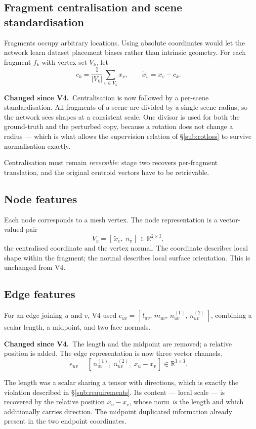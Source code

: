 \documentclass[11pt,a4paper]{report}
\newcommand{\change}[1]{\par\vspace{2pt}\noindent\textcolor{soft}{\small\textbf{Changed since V4.}\ #1}\par\vspace{2pt}}
\begin{document}
\subsection{Fragment centralisation and scene standardisation}
\label{sub:centralisation}

Fragments occupy arbitrary locations. Using absolute coordinates would let the
network learn dataset placement biases rather than intrinsic geometry. For each
fragment $f_k$ with vertex set $V_k$, let
\[
c_k = \frac{1}{|V_k|}\sum_{v \in V_k} x_v, \qquad \tilde{x}_v = x_v - c_k .
\]

\change{Centralisation is now followed by a per-scene standardisation. All
fragments of a scene are divided by a single scene radius, so the network sees
shapes at a consistent scale. One divisor is used for both the ground-truth and
the perturbed copy, because a rotation does not change a radius --- which is
what allows the supervision relation of \S\ref{sub:rotloss} to survive
normalisation exactly.}

Centralisation must remain \emph{reversible}: stage two recovers per-fragment
translation, and the original centroid vectors have to be retrievable.

\subsection{Node features}
\label{sub:node}

Each node corresponds to a mesh vertex. The node representation is a
vector-valued pair
\[
V_v = [\,\tilde{x}_v,\; n_v\,] \in \mathbb{R}^{2\times 3},
\]
the centralised coordinate and the vertex normal. The coordinate describes local
shape within the fragment; the normal describes local surface orientation. This
is unchanged from V4.

\subsection{Edge features}
\label{sub:edge}

For an edge joining $u$ and $v$, V4 used
$e_{uv} = [\,l_{uv},\, m_{uv},\, n^{(1)}_{uv},\, n^{(2)}_{uv}\,]$, combining a
scalar length, a midpoint, and two face normals.

\change{The length and the midpoint are removed; a relative position is added.
The edge representation is now three vector channels,
\[
e_{uv} = [\,n^{(1)}_{uv},\; n^{(2)}_{uv},\; x_u - x_v\,] \in \mathbb{R}^{3\times 3}.
\]}

The length was a scalar sharing a tensor with directions, which is exactly the
violation described in \S\ref{sub:requirements}. Its content --- local scale --- is recovered by
the relative position $x_u - x_v$, whose norm \emph{is} the length and which
additionally carries direction. The midpoint duplicated information already
present in the two endpoint coordinates.
\end{document}
